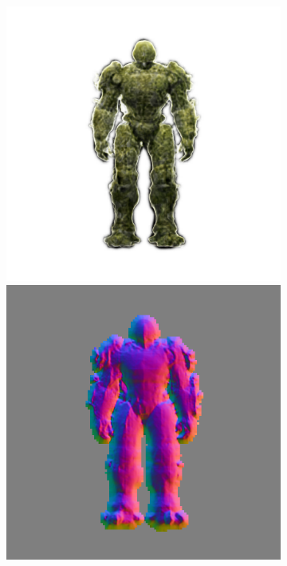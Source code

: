 \begin{figure}[H]
\begin{subfigure}[b]{0.18\textwidth}
        \caption{}
    \end{subfigure}
    \begin{subfigure}[b]{0.18\textwidth}
        \centering
        \fontsize{9pt}{7pt}\selectfont{}
        \includegraphics[width=\textwidth]{figures/generationProcess/wonder3D_6000_front_part2}
        \includegraphics[width=\textwidth]{figures/generationProcess/wonder3D_6000_front_part4}

\end{subfigure}
\end{figure}

